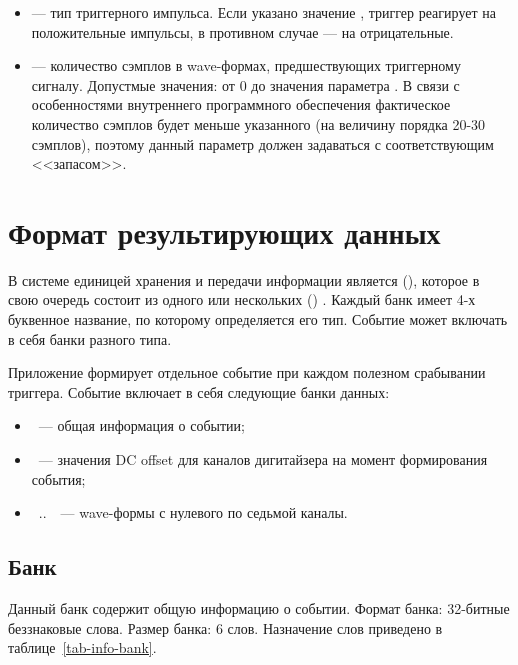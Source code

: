 \begin{itemize}
\item {} --- тип триггерного импульса. Если указано значение , триггер реагирует на положительные импульсы, в противном случае --- на отрицательные.

\item {} --- количество сэмплов в wave-формах, предшествующих триггерному сигналу. Допустмые значения: от 0 до значения параметра . В связи с особенностями внутреннего программного обеспечения \DEVICE{} \cite{CaenUM5961PostTrigger} фактическое количество сэмплов будет меньше указанного (на величину порядка 20-30 сэмплов), поэтому данный параметр должен задаваться с соответствующим <<запасом>>.

\end{itemize}

\section{Формат результирующих данных}

В системе \MIDAS{} единицей хранения и передачи информации является  (), которое в свою очередь состоит из одного или нескольких  () \cite{MidasWikiEvent}. Каждый банк имеет 4-х буквенное название, по которому определяется его тип. Событие может включать в себя банки разного типа.

Приложение  формирует отдельное событие при каждом полезном срабывании триггера. Событие включает в себя следующие банки данных:

\begin{itemize}

\item {}~--- общая информация о событии;
\item {}~--- значения DC offset для каналов дигитайзера на момент формирования события;
\item {}~..~~--- wave-формы с нулевого по седьмой каналы.

\end{itemize}

\subsection{Банк }
\label{sec_bank_info}

Данный банк содержит общую информацию о событии. Формат банка: 32-битные беззнаковые слова. Размер банка: 6 слов. Назначение слов приведено в таблице~\ref{tab-info-bank}.

